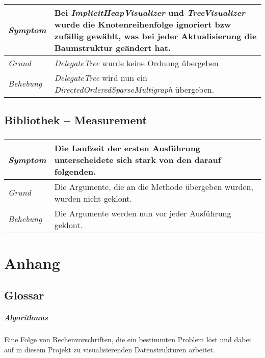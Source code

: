 \documentclass[a4paper]{report}
\begin{document}
\subsection{}
\begin{tabular}{p{2.5cm}  p{11.5cm}}
  \hline
  \textit{Symptom} & Bei \emph{ImplicitHeapVisualizer} und \emph{TreeVisualizer} wurde die Knotenreihenfolge ignoriert bzw zufällig gewählt, was bei jeder Aktualisierung die Baumstruktur geändert hat. \\
  \hline
  \textit{Grund} & \emph{DelegateTree} wurde keine Ordnung übergeben\\
  \hline
  \textit{Behebung} & \emph{DelegateTree} wird nun ein \emph{DirectedOrderedSparseMultigraph} übergeben.\\
  \hline
\end{tabular}

\section{Bibliothek -- Measurement}

\subsection{}
\begin{tabular}{p{2.5cm}  p{11.5cm}}
  \hline
  \textit{Symptom} & Die Laufzeit der ersten Ausführung unterscheidete sich stark von den darauf folgenden. \\
  \hline
  \textit{Grund} & Die Argumente, die an die Methode übergeben wurden, wurden nicht geklont. \\
  \hline
  \textit{Behebung} & Die Argumente werden nun vor jeder Ausführung geklont. \\
  \hline
\end{tabular}

\chapter{Anhang}

\section{Glossar}

\paragraph{Algorithmus} Eine Folge von Rechenvorschriften, die ein bestimmten Problem löst und dabei auf in diesem Projekt zu visualisierenden Datenstrukturen arbeitet.
\end{document}
